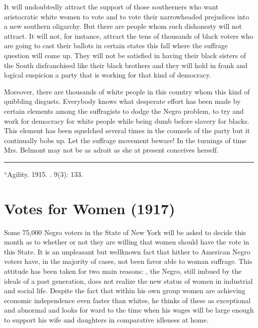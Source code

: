 \documentclass[letterpaper,10pt,english]{jupyterBook}
\begin{document}
\sphinxAtStartPar
It will undoubtedly attract the support of those southerners who want aristocratic white women to vote and to vote their narrow\sphinxhyphen{}headed prejudices into a new southern oligarchy. But there are people whom such dishonesty will not attract. It will not, for instance, attract the tens of thousands of black voters who are going to cast their ballots in certain states this fall where the suffrage question will come up. They will not be satisfied in having their black sisters of the South disfranchised like their black brothers and they will hold in frank and logical suspicion a party that is working for that kind of democracy.

\sphinxAtStartPar
Moreover, there are thousands of white people in this country whom this kind of quibbling disgusts. Everybody knows what desperate effort has been made by certain elements among the suffragists to dodge the Negro problem, to try and work for democracy for white people while being dumb before slavery for blacks. This element has been squelched several times in the counsels of the party but it continually bobs up. Let the suffrage movement beware! In the turnings of time Mrs. Belmont may not be as adroit as she at present con­ceives herself.


\bigskip\hrule\bigskip


\sphinxAtStartPar
{} “Agility. 1915. . 9(3): 133.


\section{Votes for Women (1917)}
\label{\detokenize{Volumes/15/01/votes_for_women:votes-for-women-1917}}\label{\detokenize{Volumes/15/01/votes_for_women::doc}}
\sphinxAtStartPar
Some 75,000 Negro voters in the State of New York will be asked to decide this month as to whether or not they are willing that women should have the vote in this State. It is an unpleas­ant but well\sphinxhyphen{}known fact that hither­ to American Negro voters have, in the majority of cases, not been favor able to woman suffrage. This attitude has been taken for two main reasons: , the Negro, still imbued by the ideals of a past genera­tion, does not realize the new status of women in industrial and social life. Despite the fact that within his own­ group women are achieving economic independence even faster than whites, he thinks of these as excep­tional and abnormal and looks for­ ward to the time when his wages will be large enough to support his wife and daughters in comparative idleness at home.
\end{document}
